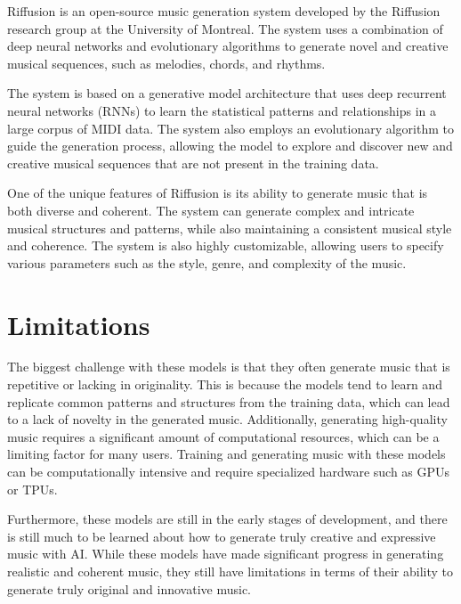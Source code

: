 \documentclass[]{MSword}
\begin{document}
\par{Riffusion\cite{riffusion} is an open-source music generation system developed by the Riffusion research group at the University of Montreal. The system uses a combination of deep neural networks and evolutionary algorithms to generate novel and creative musical sequences, such as melodies, chords, and rhythms.}

\par{The system is based on a generative model architecture that uses deep recurrent neural networks (RNNs) to learn the statistical patterns and relationships in a large corpus of MIDI data. The system also employs an evolutionary algorithm to guide the generation process, allowing the model to explore and discover new and creative musical sequences that are not present in the training data.}

\par{One of the unique features of Riffusion is its ability to generate music that is both diverse and coherent. The system can generate complex and intricate musical structures and patterns, while also maintaining a consistent musical style and coherence. The system is also highly customizable, allowing users to specify various parameters such as the style, genre, and complexity of the music.}

\section{Limitations}

\par{The biggest challenge with these models is that they often generate music that is repetitive or lacking in originality. This is because the models tend to learn and replicate common patterns and structures from the training data, which can lead to a lack of novelty in the generated music. Additionally, generating high-quality music requires a significant amount of computational resources, which can be a limiting factor for many users. Training and generating music with these models can be computationally intensive and require specialized hardware such as GPUs or TPUs.}

\par{Furthermore, these models are still in the early stages of development, and there is still much to be learned about how to generate truly creative and expressive music with AI. While these models have made significant progress in generating realistic and coherent music, they still have limitations in terms of their ability to generate truly original and innovative music.}
\end{document}
